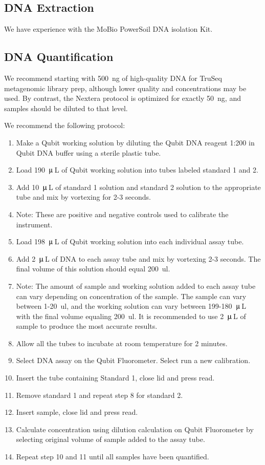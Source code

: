 \documentclass[graybox]{svmult}
\begin{document}
\subsection{DNA Extraction}
We have experience with the MoBio PowerSoil DNA isolation Kit.  

\subsection{DNA Quantification}

We recommend starting with 500~ng of high-quality DNA for TruSeq metagenomic library prep, although lower quality and concentrations may be used. By contrast, the Nextera protocol is optimized for exactly 50~ng, and samples should be diluted to that level.

We recommend the following protocol:
\begin{enumerate}
\item{     Make a Qubit working solution by diluting the Qubit DNA reagent 1:200 in Qubit DNA buffer using a sterile plastic tube.}
\item{       Load 190~$\umu$\,L of Qubit working solution into tubes labeled standard 1 and 2.}
\item{       Add 10~$\umu$\,L of standard 1 solution and standard 2 solution to the appropriate tube and mix by vortexing for 2-3 seconds.}
\item{         Note: These are positive and negative controls used to calibrate the instrument.}
\item{       Load 198~$\umu$\,L of Qubit working solution into each individual assay tube.}
\item{       Add 2~$\umu$\,L of DNA to each assay tube and mix by vortexing 2-3 seconds. The final volume of this solution should equal 200~ul.}
\item{        Note: The amount of sample and working solution added to each assay tube can vary depending on concentration of the sample. The sample can vary between 1-20~ul, and the working solution can vary between 199-180~$\umu$\,L with the final volume equaling 200~ul. It is recommended to use 2~$\umu$\,L of sample to produce the most accurate results.}
\item{       Allow all the tubes to incubate at room temperature for 2 minutes.}
\item{       Select DNA assay on the Qubit Fluorometer. Select run a new calibration.}
\item{       Insert the tube containing Standard 1, close lid and press read.}
\item{       Remove standard 1 and repeat step 8 for standard 2.}
\item{      Insert sample, close lid and press read.}
\item{      Calculate concentration using dilution calculation on Qubit Fluorometer by selecting original volume of sample added to the assay tube.}
\item{      Repeat step 10 and 11 until all samples have been quantified.}
\end{enumerate}
\end{document}
